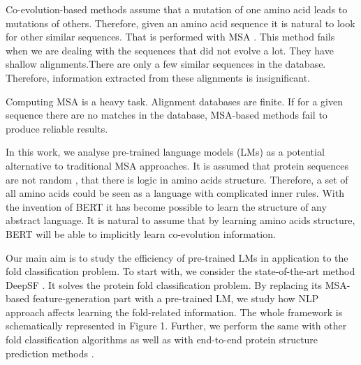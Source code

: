 \documentclass[12pt, twoside]{article}
\begin{document}
 Co-evolution-based methods assume that a mutation of one amino acid leads to mutations of others. Therefore, given an amino acid sequence it is natural to look for other similar sequences. That is performed with MSA \cite{co-evolution}. This method fails when we are dealing with the sequences that did not evolve a lot. They have shallow alignments.There are only a few similar sequences in the database. Therefore, information extracted from these alignments is insignificant. 

Computing MSA is a heavy task. Alignment databases are finite. If for a given sequence there are no matches in the database, MSA-based methods fail to produce reliable results. 

In this work, we analyse pre-trained language models (LMs)  \cite{Elnaggar} as a potential alternative to traditional MSA approaches. It is assumed that protein sequences are not random \cite{evolution-not-random}, that there is logic in amino acids structure. Therefore, a set of all amino acids could be seen as a language with complicated inner rules. With the invention of BERT \cite{bert} it has become possible to learn the structure of any abstract language. It is natural to assume that by learning amino acids structure, BERT will be able to implicitly learn co-evolution information.

Our main aim is to study the efficiency of pre-trained LMs in application to the fold classification problem.  To start with, we consider the state-of-the-art method DeepSF \cite{DeepSF}. It solves the protein fold classification problem.  By replacing its MSA-based feature-generation part with a pre-trained LM, we study how NLP approach affects learning the fold-related information.  The whole framework is schematically represented in Figure 1. Further, we perform the same with other fold classification algorithms \cite{Villegas, DeepFrag}
as well as with end-to-end protein structure prediction methods \cite{Kandathil, Xu2020.10.12.336859}.
\end{document}
